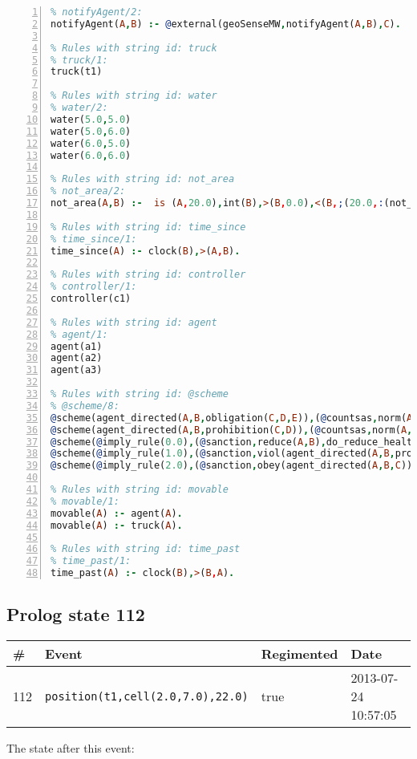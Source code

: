 \documentclass[11pt]{article}\usepackage[utf8]{inputenc}\usepackage{geometry}
\begin{document}
\begin{lstlisting}[language=Prolog, numbers=left]
% Rules with string id: notifyAgent
% notifyAgent/2:
notifyAgent(A,B) :- @external(geoSenseMW,notifyAgent(A,B),C).

% Rules with string id: truck
% truck/1:
truck(t1)

% Rules with string id: water
% water/2:
water(5.0,5.0)
water(5.0,6.0)
water(6.0,5.0)
water(6.0,6.0)

% Rules with string id: not_area
% not_area/2:
not_area(A,B) :-  is (A,20.0),int(B),>(B,0.0),<(B,;(20.0,:(not_area(A,B), is (-(B),20.0)))),int(A),>(A,0.0),<(A,;(20.0,:(area(A,B),-(int(A))))),int(B),>(A,0.0),>(B,0.0),<(A,21.0),<(B,21.0).

% Rules with string id: time_since
% time_since/1:
time_since(A) :- clock(B),>(A,B).

% Rules with string id: controller
% controller/1:
controller(c1)

% Rules with string id: agent
% agent/1:
agent(a1)
agent(a2)
agent(a3)

% Rules with string id: @scheme
% @scheme/8:
@scheme(agent_directed(A,B,obligation(C,D,E)),(@countsas,norm(A,B,F,obligation(C,D,E)),F),false,(listTrue(C)),(time_past(D)),false,[plus(viol(agent_directed(A,B,obligation(C,D,E))))|[]],[plus(obey(agent_directed(A,B,obligation(C,D,E))))|[]])
@scheme(agent_directed(A,B,prohibition(C,D)),(@countsas,norm(A,B,E,prohibition(C,D)),E),(listTrue(C)),false,(false),false,[plus(viol(agent_directed(A,B,prohibition(C,D))))|[]],[plus(obey(agent_directed(A,B,prohibition(C,D))))|[]])
@scheme(@imply_rule(0.0),(@sanction,reduce(A,B),do_reduce_health(A,B),notifyAgent(A,changed(status))),true,false,false,false,[min(reduce(A,B))|[]],[])
@scheme(@imply_rule(1.0),(@sanction,viol(agent_directed(A,B,prohibition(C,D))),do_sanction(D)),true,false,false,false,[min(viol(agent_directed(A,B,prohibition(C,D))))|[]],[])
@scheme(@imply_rule(2.0),(@sanction,obey(agent_directed(A,B,C))),true,false,false,false,[min(obey(agent_directed(A,B,C)))|[]],[])

% Rules with string id: movable
% movable/1:
movable(A) :- agent(A).
movable(A) :- truck(A).

% Rules with string id: time_past
% time_past/1:
time_past(A) :- clock(B),>(B,A).

\end{lstlisting}
\clearpage 
\subsection{Prolog state 112}
\begin{table}[ht]
\centering 
\begin{tabular}{l l l l} 
\textbf{\#} & \textbf{Event} & \textbf{Regimented} & \textbf{Date} \\ [0.5ex] 
\hline
112&\texttt{position(t1,cell(2.0,7.0),22.0)}&true&2013-07-24 10:57:05\\ [1ex] \hline\end{tabular}
\end{table}
The state after this event:
\end{document}
